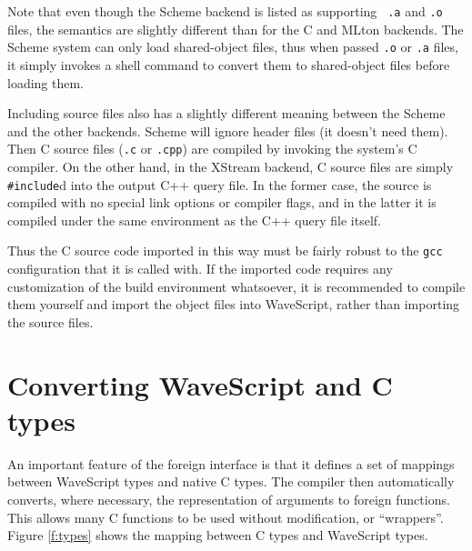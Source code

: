 Note that even though the Scheme backend is listed as supporting {\tt
.a} and {\tt .o} files, the semantics are slightly different than for
the C and MLton backends.  The Scheme system can only load
shared-object files, thus when passed {\tt .o} or {\tt .a} files, it
simply invokes a shell command to convert them to shared-object files
before loading them.

Including source files also has a slightly different meaning between
the Scheme and the other backends.  Scheme will ignore header files
(it doesn't need them).  Then C source files ({\tt .c} or {\tt .cpp})
are compiled by invoking the system's C compiler.  On the other hand,
in the XStream backend, C source files are simply {\tt \#include}d
into the output C++ query file.  In the former case, the source is
compiled with no special link options or compiler flags, and in the
latter it is compiled under the same environment as the C++ query file
itself.  

Thus the C source code imported in this way must be fairly
robust to the {\tt gcc} configuration that it is called with.
If the imported code requires any customization of
the build environment whatsoever, it is recommended to compile them
yourself and import the object files into WaveScript, rather than
importing the source files.





\section{Converting WaveScript and C types}

An important feature of the foreign interface is that it defines a set
of mappings between WaveScript types and native C types.  The compiler
then automatically converts, where necessary, the representation of arguments to foreign
functions.
This allows many C functions to be used without modification, or ``wrappers''.  Figure
\ref{f:types} shows the mapping between C types and WaveScript types.


